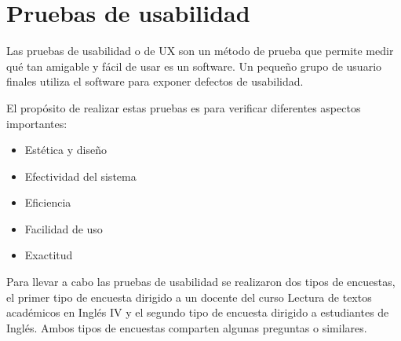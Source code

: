 \documentclass[../Main.tex]{subfiles}
\begin{document}
    \section{Pruebas de usabilidad}
    \begin{justify}
    Las pruebas de usabilidad o de UX son un método de prueba que permite medir qué tan amigable y fácil de usar es un software. Un pequeño grupo de usuario finales utiliza el software para exponer defectos de usabilidad.
    
    El propósito de realizar estas pruebas es para verificar diferentes aspectos importantes:
    
    \begin{itemize}
        \item Estética y diseño
        \item Efectividad del sistema
        \item Eficiencia
        \item Facilidad de uso
        \item Exactitud

    \end{itemize}
    
    Para llevar a cabo las pruebas de usabilidad se realizaron dos tipos de encuestas, el primer tipo de encuesta dirigido a un docente del curso Lectura de textos académicos en Inglés IV y el segundo tipo de encuesta dirigido a estudiantes de Inglés. Ambos tipos de encuestas comparten algunas preguntas o similares.

    \end{justify}
    
\end{document}
